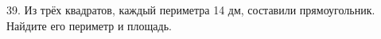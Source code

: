 39. Из трёх квадратов, каждый периметра 14 дм, составили прямоугольник. Найдите его периметр и площадь.\\
